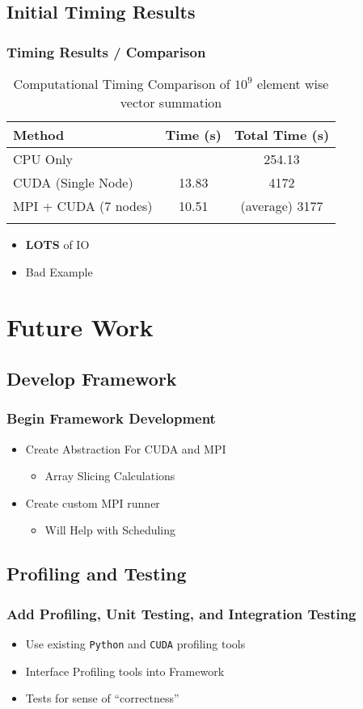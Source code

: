 \documentclass{beamer}
\begin{document}
\subsection{Initial Timing Results}
\begin{frame}
\frametitle{Timing Results / Comparison}
\begin{table}[htb]
\centering
\begin{tabular}{lcc}
\toprule{}
\textbf{Method} & \textbf{Time (s)} & \textbf{Total Time (s)} \\
\midrule{}
CPU Only & & 254.13 \\
\midrule{}
CUDA (Single Node) & 13.83 & 4172 \\
\midrule{}
MPI + CUDA (7 nodes) & 10.51 & (average) 3177 \\
\bottomrule{}
\end{tabular}
\caption{Computational Timing Comparison of $ 10^9 $ element wise vector
summation}
\label{tab:compTimeComapare}
\end{table}
\begin{itemize}
\item{\textbf{LOTS} of IO}
\item{Bad Example}
\end{itemize}
\end{frame}
\section{Future Work}
\subsection{Develop Framework}
\begin{frame}
\frametitle{Begin Framework Development}
\begin{itemize}
\item{Create Abstraction For CUDA and MPI}
\begin{itemize}
\item{Array Slicing Calculations}
\end{itemize}
\item{Create custom MPI runner}
\begin{itemize}
\item{Will Help with Scheduling}
\end{itemize}
\end{itemize}
\end{frame}
\subsection{Profiling and Testing}
\begin{frame}
\frametitle{Add Profiling, Unit Testing, and Integration Testing}
\begin{itemize}
\item{Use existing \texttt{Python} and \texttt{CUDA} profiling tools}
\item{Interface Profiling tools into Framework}
\item{Tests for sense of ``correctness''}
\end{itemize}
\end{frame}
\end{document}
